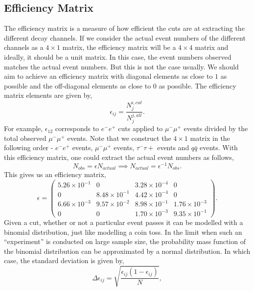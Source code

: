 \subsection{Efficiency Matrix}
The efficiency matrix is a measure of how efficient the cuts are at extracting the different decay channels. If we consider the actual event numbers of the different channels as a $4 \times 1$ matrix, the efficiency matrix will be a $4 \times 4$ matrix and ideally, it should be a unit matrix. In this case, the event numbers observed matches the actual event numbers. But this is not the case usually. We should aim to achieve an efficiency matrix with diagonal elements as close to $1$ as possible and the off-diagonal elements as close to $0$ as possible. The efficiency matrix elements are given by\cite{UB},
\begin{equation}
    \epsilon_{ij} = \frac{N^{i, cut}_j}{N^{j, all}_j}.
\end{equation}
For example, $\epsilon_{12}$ corresponds to $e^-e^+$ cuts applied to $\mu^-\mu^+$ events divided by the total observed $\mu^-\mu^+$ events. Note that we construct the $4 \times 1$ matrix in the following order - $e^-e^+$ events, $\mu^-\mu^+$ events, $\tau^-\tau+$ events and $q\bar{q}$ events. With this efficiency matrix, one could extract the actual event numbers as follows,
\begin{equation}
    N_{obs} = \epsilon N_{actual} \implies N_{actual} = \epsilon^{-1} N_{obs}.
\end{equation}
This gives us an efficiency matrix,
\begin{equation}
    \epsilon = 
    \begin{pmatrix}
        5.26 \times 10^{-1} & 0 & 3.28 \times 10^{-4} & 0 \\
        0 & 8.48 \times 10^{-1} & 4.42 \times 10^{-4} & 0 \\
        6.66 \times 10^{-3} & 9.57 \times 10^{-2} & 8.98 \times 10^{-1} & 1.76 \times 10^{-3} \\
        0 & 0 & 1.70 \times 10^{-3} & 9.35 \times 10^{-1}
    \end{pmatrix}.
\end{equation}
Given a cut, whether or not a particular event passes it can be modelled with a binomial distribution, just like modelling a coin toss. In the limit when such an ``experiment'' is conducted on large sample size, the probability mass function of the binomial distribution can be approximated by a normal distribution. In which case, the standard deviation is given by,
\begin{equation}
    \Delta \epsilon_{ij} = \sqrt{\frac{\epsilon_{ij}(1-\epsilon_{ij})}{N}},
\end{equation}

